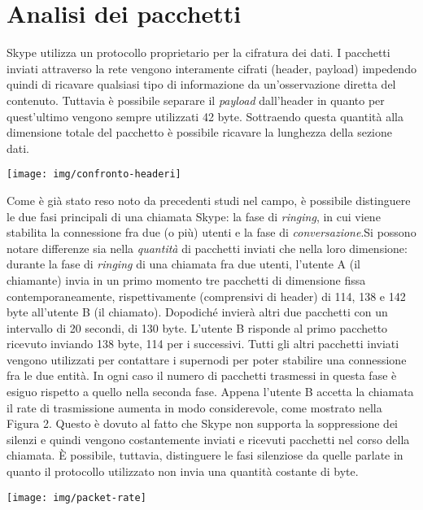 \section{Analisi dei pacchetti}
Skype utilizza un protocollo proprietario per la cifratura dei dati. I pacchetti inviati attraverso la rete vengono interamente cifrati (header, payload) impedendo quindi di ricavare qualsiasi tipo di informazione da un'osservazione diretta del contenuto. Tuttavia è possibile separare il \emph{payload} dall'header in quanto per quest'ultimo vengono sempre utilizzati 42 byte. Sottraendo questa quantità alla dimensione totale del pacchetto è possibile ricavare la lunghezza della sezione dati.
\newline\newline\newline
\begin{minipage}{\linewidth}
\texttt{[image: img/confronto-headeri]}
\end{minipage}
\newpage
Come è già stato reso noto da precedenti studi nel campo, è possibile distinguere le due fasi principali di una chiamata Skype: la fase di \textsl{ringing}, in cui viene stabilita la connessione fra due (o più) utenti e la fase di \textsl{conversazione}.\newline Si possono notare differenze sia nella \emph{quantità} di pacchetti inviati che nella loro dimensione: durante la fase di \textsl{ringing} di una chiamata fra due utenti, l'utente A (il chiamante) invia in un primo momento tre pacchetti di dimensione fissa contemporaneamente, rispettivamente (comprensivi di header) di 114, 138 e 142 byte all'utente B (il chiamato). Dopodiché invierà altri due pacchetti con un intervallo di 20 secondi, di 130 byte. L'utente B risponde al primo pacchetto ricevuto inviando 138 byte, 114 per i successivi. Tutti gli altri pacchetti inviati vengono utilizzati per contattare i supernodi per poter stabilire una connessione fra le due entità. In ogni caso il numero di pacchetti trasmessi in questa fase è esiguo rispetto a quello nella seconda fase.\newline
Appena l'utente B accetta la chiamata il rate di trasmissione aumenta in modo considerevole, come mostrato nella Figura 2. Questo è dovuto al fatto che Skype non supporta la soppressione dei silenzi e quindi vengono costantemente inviati e ricevuti pacchetti nel corso della chiamata. È possibile, tuttavia, distinguere le fasi silenziose da quelle parlate in quanto il protocollo utilizzato non invia una quantità costante di byte.\newline\newline\newline\newline
\begin{minipage}{\linewidth}
\texttt{[image: img/packet-rate]}
\end{minipage}
